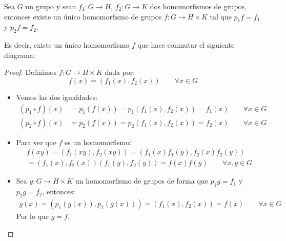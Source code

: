 \begin{teo}\label{teo:prop_universal_directo}
    Sea $G$ un grupo y sean $f_1:G\to H$, $f_2:G\to K$ dos homomorfismos de grupos, entonces existe un único homomorfismo de grupos $f:G\to H\times K$ tal que $p_1f=f_1$ y $p_2f = f_2$. 

    \noindent
    Es decir, existe un único homomorfismo $f$ que hace conmutar el siguiente diagrama:

    \begin{figure}[H]
        \centering
    \end{figure}

    \begin{proof}
        Definimos $f:G\to H\times K$ dada por:
        \begin{equation*}
            f(x) = (f_1(x), f_2(x)) \qquad \forall x\in G
        \end{equation*}
        \begin{itemize}
            \item Vemos las dos igualdades:
                \begin{align*}
                    (p_1\circ f)(x) &= p_1(f(x)) = p_1(f_1(x), f_2(x)) = f_1(x) \qquad \forall x\in G \\
                    (p_2\circ f)(x) &= p_2(f(x)) = p_2(f_1(x), f_2(x)) = f_2(x) \qquad \forall x\in G
                \end{align*}
            \item Para ver que $f$ es un homomorfismo:
                \begin{multline*}
                    f(xy) = (f_1(xy), f_2(xy)) = (f_1(x)f_1(y), f_2(x)f_2(y))  \\ = (f_1(x),f_2(x))(f_1(y),f_2(y)) = f(x)f(y) \qquad \forall x,y\in G
                \end{multline*}
            \item Sea $g:G\to H\times K$ un homomorfismo de grupos de forma que $p_1g = f_1$ y $p_2g=f_2$, entonces:
                \begin{align*}
                    g(x) = (p_1(g(x)), p_2(g(x))) = (f_1(x), f_2(x)) = f(x) \qquad \forall x\in G
                \end{align*}
                Por lo que $g = f$.
        \end{itemize}
    \end{proof}
\end{teo}

